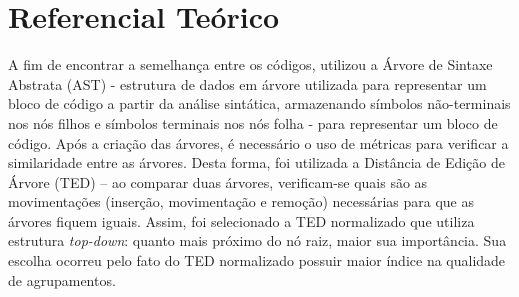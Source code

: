 \chapter{Referencial Teórico}
    A fim de encontrar a semelhança entre os códigos, 
    utilizou a Árvore de Sintaxe Abstrata (AST) - estrutura de dados em árvore
    utilizada para representar um bloco de código a partir da análise sintática,
    armazenando símbolos não-terminais nos nós filhos e símbolos terminais nos
    nós folha - para representar um bloco de código. Após a criação das árvores,
    é necessário o uso de métricas para verificar a similaridade entre as árvores.
    Desta forma, foi utilizada a Distância de Edição de Árvore (TED) – ao comparar
    duas árvores, verificam-se quais são as movimentações (inserção, movimentação
    e remoção) necessárias para que as árvores fiquem iguais. Assim, foi
    selecionado a TED normalizado que utiliza estrutura \textit{top-down}:
    quanto mais próximo do nó raiz, maior sua importância. Sua escolha ocorreu
    pelo fato do TED normalizado possuir maior índice na qualidade de agrupamentos.
    
